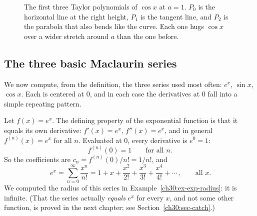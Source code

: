 \begin{figure}[htbp]
\centering
{}
\caption{The first three Taylor polynomials of $\cos x$ at $a=1$. $P_0$ is the horizontal line at the right height, $P_1$ is the tangent line, and $P_2$ is the parabola that also bends like the curve. Each one hugs $\cos x$ over a wider stretch around $a$ than the one before.}
\label{ch30:fig-p012}
\end{figure}

\subsection{The three basic Maclaurin series}

We now compute, from the definition, the three series used most often: $e^x$, $\sin x$, $\cos x$. Each is centered at $0$, and in each case the derivatives at $0$ fall into a simple repeating pattern.

\begin{example}
\label{ch30:ex-exp-series}
Let $f(x) = e^x$. The defining property of the exponential function is that it equals its own derivative: $f'(x) = e^x$, $f''(x) = e^x$, and in general $f^{(n)}(x) = e^x$ for all $n$. Evaluated at $0$, every derivative is $e^0 = 1$:
\[
  f^{(n)}(0) = 1 \qquad \text{for all } n.
\]
So the coefficients are $c_n = f^{(n)}(0)/n! = 1/n!$, and
\[
  \boxed{\,e^x = \sum_{n=0}^{\infty} \frac{x^n}{n!}
  = 1 + x + \frac{x^2}{2!} + \frac{x^3}{3!} + \frac{x^4}{4!} + \cdots\,}, \qquad \text{all } x.
\]
We computed the radius of this series in Example~\ref{ch30:ex-exp-radius}: it is infinite. (That the series actually \emph{equals} $e^x$ for every $x$, and not some other function, is proved in the next chapter; see Section~\ref{ch30:sec-catch}.)
\end{example}

